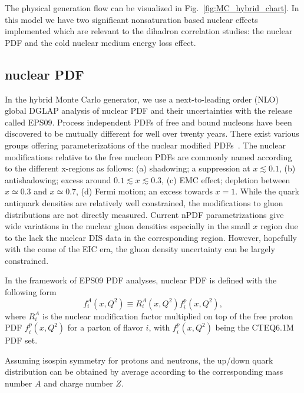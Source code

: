 The physical generation flow can be visualized in Fig.~\ref{fig:MC_hybrid_chart}.
In this model we have two significant nonsaturation based nuclear effects implemented which are relevant to the dihadron correlation studies: the nuclear PDF and the cold nuclear medium energy loss effect.

\subsection{nuclear PDF}
In the hybrid Monte Carlo generator, we use a next-to-leading order (NLO) global
DGLAP analysis of nuclear PDF and their uncertainties with the release called
EPS09. Process independent PDFs of free and bound nucleons
have been discovered to be mutually different for well over twenty years. There
exist various groups offering parameterizations of the nuclear modified PDFs~\cite{Hirai:2004wq,deFlorian:2003qf}.
The nuclear modifications relative to the free nucleon PDFs are commonly named
according to the different x-regions as follows: (a) shadowing; a suppression at
$x\lesssim 0.1$, (b) antishadowing; excess around $0.1\lesssim x \lesssim 0.3$,
(c) EMC effect; depletion between $x\simeq 0.3$ and $x \simeq 0.7$, (d) Fermi
motion; an excess towards $x=1$. While the quark antiquark densities are
relatively well constrained, the modifications to gluon distributions are not
directly measured. Current nPDF parametrizations give wide variations in the
nuclear gluon densities especially in the small $x$ region due to the lack the
nuclear DIS data in the corresponding region. However, hopefully with the come
of the EIC era, the gluon density uncertainty can be largely constrained.

In the framework of EPS09 PDF analyses, nuclear PDF is defined with the following form
\begin{equation}
f^{A}_{i}(x, Q^{2}) \equiv R^{A}_{i}(x, Q^{2})f^{p}_{i}(x, Q^{2}),
\end{equation} 
where $R^{A}_{i}$ is the nuclear modification factor multiplied on top of the
free proton PDF $f^{p}_{i}(x, Q^{2})$ for a parton of flavor $i$, 
with $f^{p}_{i}(x, Q^{2})$ being the CTEQ6.1M PDF set. 


Assuming isospin symmetry for protons and neutrons, the up/down quark
distribution can be obtained by average according to the corresponding mass
number $A$ and charge number $Z$.


